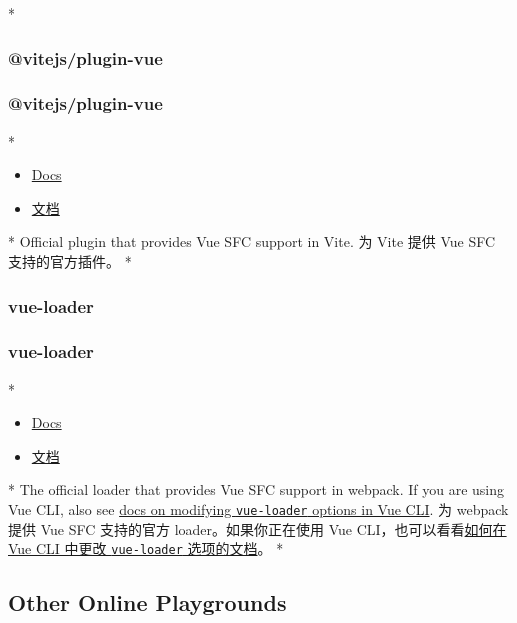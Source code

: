 \begin{paracol}{2}
 
\switchcolumn[0]*%
\subsubsection{@vitejs/plugin-vue}
\switchcolumn
\subsubsection{@vitejs/plugin-vue}
\switchcolumn[0]*%
\begin{itemize}
\item
  \href{https://github.com/vitejs/vite-plugin-vue/tree/main/packages/plugin-vue}{Docs}
\end{itemize}
\switchcolumn
\begin{itemize}
\item
  \href{https://github.com/vitejs/vite-plugin-vue/tree/main/packages/plugin-vue}{文档}
\end{itemize}
\switchcolumn[0]*%
Official plugin that provides Vue SFC support in Vite.
\switchcolumn
为 Vite 提供 Vue SFC 支持的官方插件。
\switchcolumn[0]*%
\subsubsection{vue-loader}
\switchcolumn
\subsubsection{vue-loader}
\switchcolumn[0]*%
\begin{itemize}
\item
  \href{https://vue-loader.vuejs.org/}{Docs}
\end{itemize}
\switchcolumn
\begin{itemize}
\item
  \href{https://vue-loader.vuejs.org/zh/}{文档}
\end{itemize}
\switchcolumn[0]*%
The official loader that provides Vue SFC support in webpack. If you are
using Vue CLI, also see
\href{https://cli.vuejs.org/guide/webpack.html\#modifying-options-of-a-loader}{docs
on modifying \texttt{vue-loader} options in Vue CLI}.
\switchcolumn
为 webpack 提供 Vue SFC 支持的官方 loader。如果你正在使用 Vue
CLI，也可以看看\href{https://cli.vuejs.org/zh/guide/webpack.html\#修改-loader-选项}{如何在
Vue CLI 中更改 \texttt{vue-loader} 选项的文档}。
\switchcolumn[0]*%
\subsection{Other Online Playgrounds}
\switchcolumn

\end{paracol}
